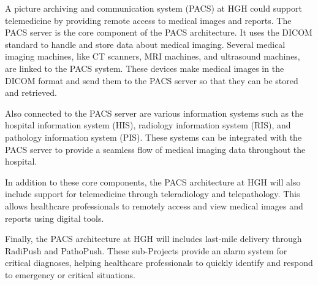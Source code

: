 \documentclass{article}
\begin{document}
A picture archiving and communication system (PACS) at HGH could support telemedicine by providing remote access to medical images and reports. 
The PACS server is the core component of the PACS architecture. It uses the DICOM standard to handle and store data about medical imaging. Several medical imaging machines, like CT scanners, MRI machines, and ultrasound machines, are linked to the PACS system. These devices make medical images in the DICOM format and send them to the PACS server so that they can be stored and retrieved.


Also connected to the PACS server are various information systems such as the hospital information system (HIS), radiology information system (RIS), and pathology information system (PIS). These systems can be integrated with the PACS server to provide a seamless flow of medical imaging data throughout the hospital.

In addition to these core components, the PACS architecture at HGH will also include support for telemedicine through teleradiology and telepathology. This allows healthcare professionals to remotely access and view medical images and reports using digital tools.

Finally, the PACS architecture at HGH will includes last-mile delivery through RadiPush and PathoPush. These sub-Projects provide an alarm system for critical diagnoses, helping healthcare professionals to quickly identify and respond to emergency or critical situations.
\end{document}
